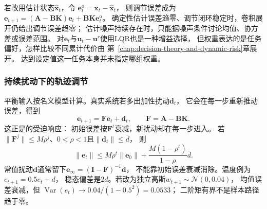若改用估计状态$\widehat{\bm x}_t$，令
$\bm e_t^{\mathrm o}=\bm x_t-\widehat{\bm x}_t$，
则调节误差成为
$\bm e_{t+1}=(\bm A-\bm B\bm K)\bm e_t+\bm B\bm K\bm e_t^{\mathrm o}$。
确定性估计误差趋零、调节闭环稳定时，卷积展开仍给出调节误差趋零；
估计噪声持续存在时，只能据噪声条件讨论均值、协方差或误差范围。
对$\bm e_t$与$\bm u_t-\bm u^r$使用LQR也是一种增益选择，
但权重表达的是任务偏好，怎样比较不同累计代价由
第~\ref{chap:decision-theory-and-dynamic-risk}章展开。
达到设定值这一任务本身并未指定哪组权重。

\subsubsection{持续扰动下的轨迹调节}
平衡输入按名义模型计算。真实系统若多出加性扰动$\bm d_t$，
它会在每一步重新推动误差，得到
\begin{equation}
  \bm e_{t+1}=\bm F\bm e_t+\bm d_t,
  \qquad \bm F=\bm A-\bm B\bm K.
  \label{eq:control-regulation-disturbance}
\end{equation}
这正是的受迫响应：
初始误差按$\bm F^t$衰减，新扰动却在每一步进入。
若$\|\bm F^j\|\leq M\rho^j$、$0<\rho<1$且$\|\bm d_t\|\leq\bar d$，
则
\[
  \|\bm e_t\|\leq M\rho^t\|\bm e_0\|
       +\frac{M(1-\rho^t)}{1-\rho}\bar d.
\]
常值扰动$\bm d$通常留下$\bm e_\infty=(\bm I-\bm F)^{-1}\bm d$，
不能靠初始误差衰减消除。温度例为$e_{t+1}=0.5e_t+d$，
稳态偏差是$2d$。若改为独立高斯$w_{t+1}\sim\mathcal N(0,0.04)$，
均值误差衰减，但
$\operatorname{Var}(e_t)\to0.04/(1-0.5^2)=0.053\overline3$；
二阶矩有界不是样本路径趋于零。


